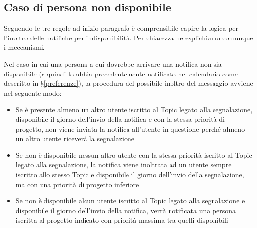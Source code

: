 \subsection{Caso di persona non disponibile}
Seguendo le tre regole ad inizio paragrafo è comprensibile capire la logica per l'inoltro delle notifiche per indisponibilità. Per chiarezza ne esplichiamo comunque i meccanismi. \par 
Nel caso in cui una persona a cui dovrebbe arrivare una notifica non sia disponibile (e quindi lo abbia precedentemente notificato nel calendario come descritto in \S\ref{preferenze}), la procedura del possibile inoltro del messaggio avviene nel seguente modo:
\begin{itemize}
    \item Se è presente almeno un altro utente iscritto al Topic legato alla segnalazione, disponibile
    il giorno dell’invio della notifica e con la stessa priorità di progetto, non viene inviata la
    notifica all’utente in questione perché almeno un altro utente riceverà la segnalazione
    \item Se non è disponibile nessun altro utente con la stessa priorità iscritto al Topic legato alla
    segnalazione, la notifica viene inoltrata ad un utente sempre iscritto allo stesso Topic e
    disponibile il giorno dell’invio della segnalazione, ma con una priorità di progetto inferiore
    \item Se non è disponibile alcun utente iscritto al Topic legato alla segnalazione e disponibile
    il giorno dell’invio della notifica, verrà notificata una persona iscritta al progetto indicato
    con priorità massima tra quelli disponibili
\end{itemize}
